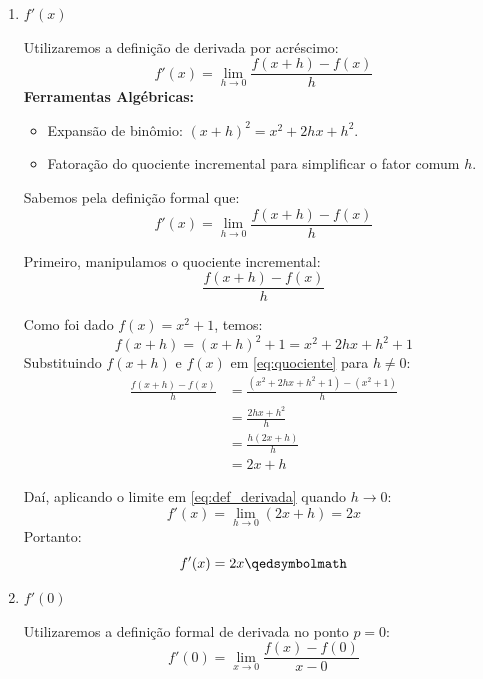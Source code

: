 \begin{enumerate}[label=\alph*)]
    \item $f'(x)$
    \begin{recursosbox}[title=Recursos Utilizados]
    Utilizaremos a definição de derivada por acréscimo:
    \[
    f'(x) = \lim_{h \to 0} \frac{f(x + h) - f(x)}{h}
    \]
    \textbf{Ferramentas Algébricas:}
    \begin{itemize}[noitemsep, topsep=2pt]
        \item Expansão de binômio: $(x + h)^2 = x^2 + 2hx + h^2$.
        \item Fatoração do quociente incremental para simplificar o fator comum $h$.
    \end{itemize}
    \end{recursosbox}

    Sabemos pela definição formal que:
    \begin{equation}
        f'(x) = \lim_{h \to 0} \frac{f(x + h) - f(x)}{h} \label{eq:def_derivada}
    \end{equation}

    Primeiro, manipulamos o quociente incremental:
    \begin{equation}
        \frac{f(x + h) - f(x)}{h} \label{eq:quociente}
    \end{equation}

    Como foi dado $f(x) = x^2 + 1$, temos:
    \[
    f(x + h) = (x + h)^2 + 1 = x^2 + 2hx + h^2 + 1
    \]
    Substituindo $f(x + h)$ e $f(x)$ em \eqref{eq:quociente} para $h \neq 0$:
    \begin{align*}
        \frac{f(x + h) - f(x)}{h} &= \frac{(x^2 + 2hx + h^2 + 1) - (x^2 + 1)}{h} \\[0.25cm]
        &= \frac{2hx + h^2}{h} \\[0.25cm]
        &= \frac{h(2x + h)}{h} \\[0.25cm]
        &= 2x + h
    \end{align*}

    Daí, aplicando o limite em \eqref{eq:def_derivada} quando $h \to 0$:
    \[
    f'(x) = \lim_{h \to 0} (2x + h) = 2x
    \]
    Portanto:
    \[
    f'(x) = 2x \qedsymbolmath
    \]

    \item $f'(0)$
    \setcounter{equation}{0}

    \begin{recursosbox}[title=Recursos Utilizados]
    Utilizaremos a definição formal de derivada no ponto $p = 0$:
    \[
    f'(0) = \lim_{x \to 0} \frac{f(x) - f(0)}{x - 0}
    \]
    \end{recursosbox}


\end{enumerate}
